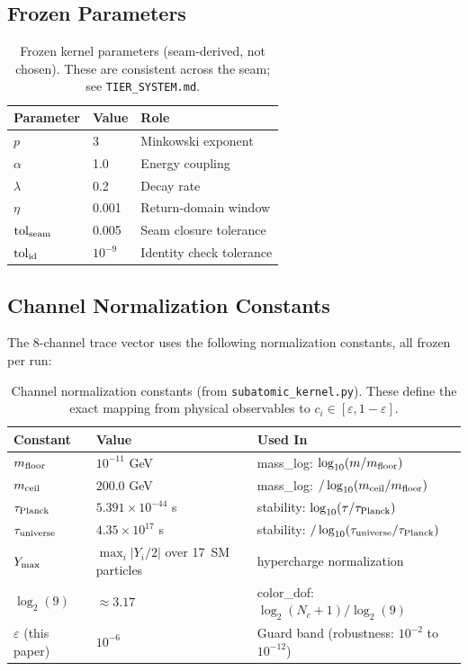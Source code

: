 \documentclass[11pt,a4paper]{article}
\theoremstyle{plain}
\theoremstyle{definition}
\theoremstyle{remark}
\newcommand{\eps}{\varepsilon}
\begin{document}
\subsection{Frozen Parameters}

\begin{table}[H]
\caption{Frozen kernel parameters (seam-derived, not chosen).
These are consistent across the seam; see \texttt{TIER\_SYSTEM.md}.}
\label{tab:frozen}
\centering\small
\begin{tabular}{@{}lll@{}}
\toprule
\textbf{Parameter} & \textbf{Value} & \textbf{Role} \\
\midrule
$p$                & 3      & Minkowski exponent \\
$\alpha$           & 1.0    & Energy coupling \\
$\lambda$          & 0.2    & Decay rate \\
$\eta$             & 0.001  & Return-domain window \\
$\mathrm{tol}_{\rm seam}$ & 0.005  & Seam closure tolerance \\
$\mathrm{tol}_{\rm id}$   & $10^{-9}$ & Identity check tolerance \\
\bottomrule
\end{tabular}
\end{table}

\subsection{Channel Normalization Constants}

The 8-channel trace vector uses the following normalization
constants, all frozen per run:

\begin{table}[H]
\caption{Channel normalization constants (from
\texttt{subatomic\_kernel.py}).  These define the exact mapping
from physical observables to $c_i \in [\eps, 1{-}\eps]$.}
\label{tab:normalization}
\centering\small
\begin{tabular}{@{}lll@{}}
\toprule
\textbf{Constant} & \textbf{Value} & \textbf{Used In} \\
\midrule
$m_{\rm floor}$   & $10^{-11}$ GeV  & mass\_log: $\log_{10}(m/m_{\rm floor})$ \\
$m_{\rm ceil}$    & $200.0$ GeV     & mass\_log: $/\log_{10}(m_{\rm ceil}/m_{\rm floor})$ \\
$\tau_{\rm Planck}$  & $5.391 \times 10^{-44}$ s & stability: $\log_{10}(\tau/\tau_{\rm Planck})$ \\
$\tau_{\rm universe}$ & $4.35 \times 10^{17}$ s & stability: $/\log_{10}(\tau_{\rm universe}/\tau_{\rm Planck})$ \\
$Y_{\rm max}$     & $\max_i |Y_i/2|$ over 17~SM particles & hypercharge normalization \\
$\log_2(9)$       & $\approx 3.17$  & color\_dof: $\log_2(N_c+1)/\log_2(9)$ \\
\midrule
$\eps$ (this paper) & $10^{-6}$ & Guard band (robustness: $10^{-2}$ to $10^{-12}$) \\
\bottomrule
\end{tabular}
\end{table}
\end{document}
